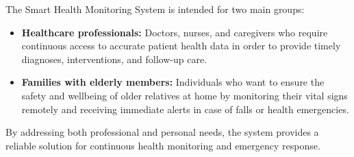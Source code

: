 The Smart Health Monitoring System is intended for two main groups:

\begin{itemize}
    \item \textbf{Healthcare professionals:} Doctors, nurses, and caregivers who require continuous access 
    to accurate patient health data in order to provide timely diagnoses, interventions, and follow-up care. 

    \item \textbf{Families with elderly members:} Individuals who want to ensure the safety and wellbeing 
    of older relatives at home by monitoring their vital signs remotely and receiving immediate alerts 
    in case of falls or health emergencies.
\end{itemize}

By addressing both professional and personal needs, the system provides a reliable solution 
for continuous health monitoring and emergency response.
